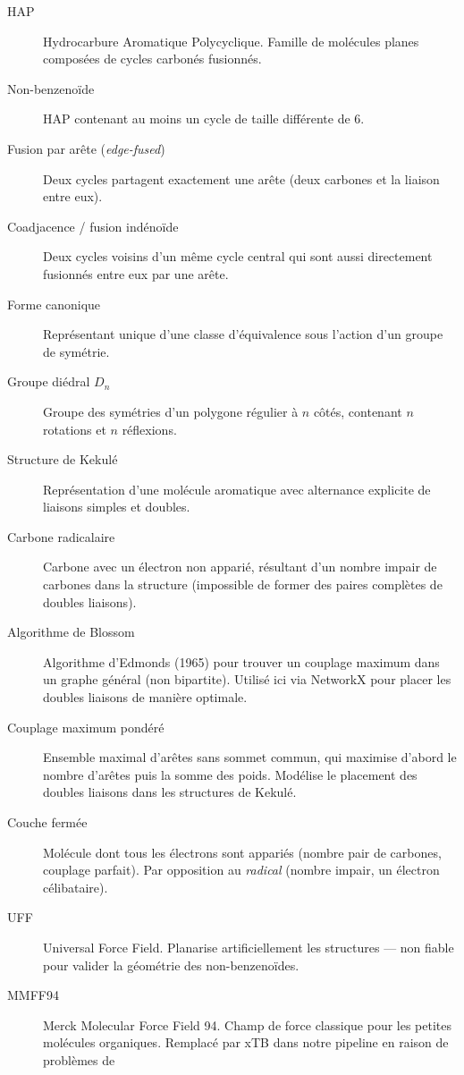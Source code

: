 \documentclass[a4paper,12pt]{article}
\begin{document}
\begin{description}
  \item[HAP] Hydrocarbure Aromatique Polycyclique. Famille de molécules planes composées de
    cycles carbonés fusionnés.
  \item[Non-benzenoïde] HAP contenant au moins un cycle de taille différente de 6.
  \item[Fusion par arête (\textit{edge-fused})] Deux cycles partagent exactement une arête
    (deux carbones et la liaison entre eux).
  \item[Coadjacence / fusion indénoïde] Deux cycles voisins d'un même cycle central qui sont
    aussi directement fusionnés entre eux par une arête.
  \item[Forme canonique] Représentant unique d'une classe d'équivalence sous l'action d'un
    groupe de symétrie.
  \item[Groupe diédral $D_n$] Groupe des symétries d'un polygone régulier à $n$ côtés,
    contenant $n$ rotations et $n$ réflexions.
  \item[Structure de Kekulé] Représentation d'une molécule aromatique avec alternance
    explicite de liaisons simples et doubles.
  \item[Carbone radicalaire] Carbone avec un électron non apparié, résultant d'un nombre
    impair de carbones dans la structure (impossible de former des paires complètes de
    doubles liaisons).
  \item[Algorithme de Blossom] Algorithme d'Edmonds (1965) pour trouver un couplage maximum
    dans un graphe général (non bipartite). Utilisé ici via NetworkX pour placer les doubles
    liaisons de manière optimale.
  \item[Couplage maximum pondéré] Ensemble maximal d'arêtes sans sommet commun, qui maximise
    d'abord le nombre d'arêtes puis la somme des poids. Modélise le placement des doubles
    liaisons dans les structures de Kekulé.
  \item[Couche fermée] Molécule dont tous les électrons sont appariés (nombre pair de carbones,
    couplage parfait). Par opposition au \textit{radical} (nombre impair, un électron
    célibataire).
  \item[UFF] Universal Force Field. Planarise artificiellement les structures — non fiable
    pour valider la géométrie des non-benzenoïdes.
  \item[MMFF94] Merck Molecular Force Field 94. Champ de force classique pour les petites
    molécules organiques. Remplacé par xTB dans notre pipeline en raison de problèmes de

\end{description}
\end{document}
